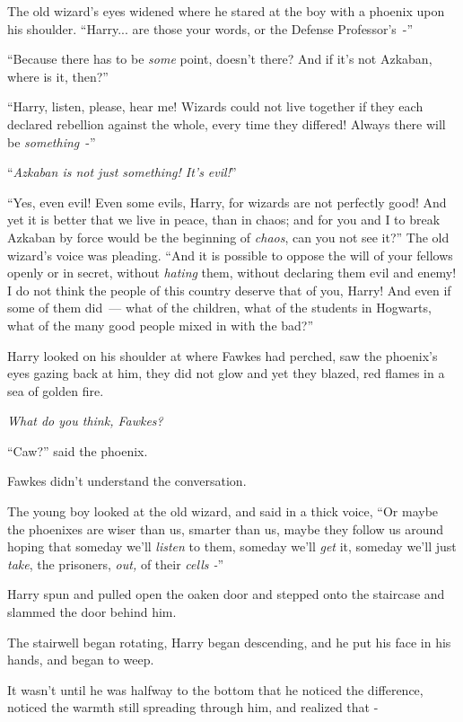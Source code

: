 The old wizard's eyes widened where he stared at the boy with a phoenix upon his shoulder. ``Harry... are those your words, or the Defense Professor's~-''

``Because there has to be \emph{some} point, doesn't there? And if it's not Azkaban, where is it, then?''

``Harry, listen, please, hear me! Wizards could not live together if they each declared rebellion against the whole, every time they differed! Always there will be \emph{something}~-''

``\emph{Azkaban is not just something! It's evil!}''

``Yes, even evil! Even some evils, Harry, for wizards are not perfectly good! And yet it is better that we live in peace, than in chaos; and for you and I to break Azkaban by force would be the beginning of \emph{chaos}, can you not see it?'' The old wizard's voice was pleading. ``And it is possible to oppose the will of your fellows openly or in secret, without \emph{hating} them, without declaring them evil and enemy! I do not think the people of this country deserve that of you, Harry! And even if some of them did~--- what of the children, what of the students in Hogwarts, what of the many good people mixed in with the bad?''

Harry looked on his shoulder at where Fawkes had perched, saw the phoenix's eyes gazing back at him, they did not glow and yet they blazed, red flames in a sea of golden fire.

\emph{What do you think, Fawkes?}

``Caw?'' said the phoenix.

Fawkes didn't understand the conversation.

The young boy looked at the old wizard, and said in a thick voice, ``Or maybe the phoenixes are wiser than us, smarter than us, maybe they follow us around hoping that someday we'll \emph{listen} to them, someday we'll \emph{get} it, someday we'll just \emph{take}, the prisoners, \emph{out,} of their \emph{cells -}''

Harry spun and pulled open the oaken door and stepped onto the staircase and slammed the door behind him.

The stairwell began rotating, Harry began descending, and he put his face in his hands, and began to weep.

It wasn't until he was halfway to the bottom that he noticed the difference, noticed the warmth still spreading through him, and realized that -

